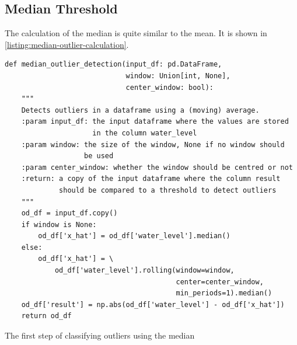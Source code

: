 \subsection{Median Threshold}
The calculation of the median is quite similar to the mean. It is shown in \autoref{listing:median-outlier-calculation}.
\begin{listing}[htp]
\small
\begin{verbatim}
def median_outlier_detection(input_df: pd.DataFrame,
                             window: Union[int, None],
                             center_window: bool):
    """
    Detects outliers in a dataframe using a (moving) average.
    :param input_df: the input dataframe where the values are stored
                     in the column water_level
    :param window: the size of the window, None if no window should
                   be used
    :param center_window: whether the window should be centred or not
    :return: a copy of the input dataframe where the column result
             should be compared to a threshold to detect outliers
    """
    od_df = input_df.copy()
    if window is None:
        od_df['x_hat'] = od_df['water_level'].median()
    else:
        od_df['x_hat'] = \
            od_df['water_level'].rolling(window=window,
                                         center=center_window,
                                         min_periods=1).median()
    od_df['result'] = np.abs(od_df['water_level'] - od_df['x_hat'])
    return od_df
\end{verbatim}
\caption{The first step of classifying outliers using the median}
\label{listing:median-outlier-calculation}
\end{listing}
\clearpage
